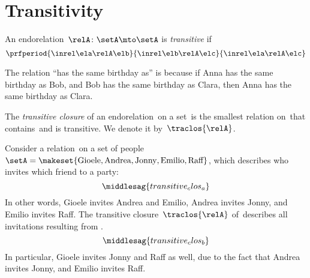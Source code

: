 
\section{Transitivity}

\begin{ctdefinition}
    \label{def:endo_transitive}
    An endorelation~$\relA\colon \setA\mto \setA$ is \emph{transitive} if
    \begin{equation}\label{eq:transitive}
        \prfperiod{
            \inrel \ela \relA \elb
        }{
            \inrel \elb \relA \elc
        }{
            \inrel \ela \relA \elc
        }
    \end{equation}
\end{ctdefinition}

\begin{example}
    The relation ``has the same birthday as'' is  because if Anna has the same birthday as Bob, and Bob has the same birthday as Clara, then Anna has the same birthday as Clara.
\end{example}

\begin{ctdefinition}
    \label{def:transitive-closure}
    The \emph{transitive closure} of an endorelation~\relA on a set~\setA is the smallest relation on~\setA that contains~\relA and is transitive.
    We denote it by~$\traclos{\relA}$.
\end{ctdefinition}


\begin{example}
    \label{exa:party}
    Consider a relation~\relA on a set of people~$\setA=\makeset{\text{Gioele}, \text{Andrea}, \text{Jonny}, \text{Emilio}, \text{Raff}}$, which describes who invites which friend to a party:
    \begin{equation}
        \label{eq:transitive_clos_a}
        \middlesag{transitive_clos_a}
    \end{equation}
    In other words, Gioele invites Andrea and Emilio, Andrea invites Jonny, and Emilio invites Raff.
    The transitive closure~$\traclos{\relA}$ of~\relA describes all invitations resulting from .
    \begin{equation}
        \label{eq:transitive_clos_b}
        \middlesag{transitive_clos_b}
    \end{equation}
    In particular, Gioele invites Jonny and Raff as well, due to the fact that Andrea invites Jonny, and Emilio invites Raff.
\end{example}

